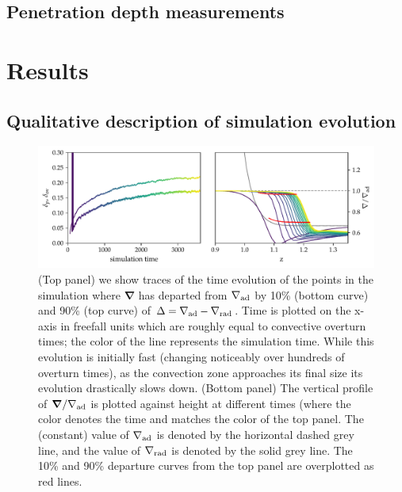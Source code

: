 \documentclass{aastex631}
\newcommand{\gradrad}{\ensuremath{\nabla_{\rm{rad}}}}
\newcommand{\gradad}{\ensuremath{\nabla_{\rm{ad}}}}
\renewcommand{\vec}[1]{\boldsymbol{#1}}
\newcommand{\grad}{\vec{\nabla}}
\begin{document}
\subsection{Penetration depth measurements}

\section{Results}
\label{sec:results}

\subsection{Qualitative description of simulation evolution}

\begin{figure}[t!]
\centering
\includegraphics[width=\textwidth]{time_evolution.pdf}
\caption{(Top panel) we show traces of the time evolution of the points in the simulation where $\grad$ has departed from $\gradad$ by 10\% (bottom curve) and 90\% (top curve) of $\Delta = \gradad - \gradrad$.
Time is plotted on the x-axis in freefall units which are roughly equal to convective overturn times; the color of the line represents the simulation time.
While this evolution is initially fast (changing noticeably over hundreds of overturn times), as the convection zone approaches its final size its evolution drastically slows down.
(Bottom panel) The vertical profile of $\grad/\gradad$ is plotted against height at different times (where the color denotes the time and matches the color of the top panel.
The (constant) value of $\gradad$ is denoted by the horizontal dashed grey line, and the value of $\gradrad$ is denoted by the solid grey line.
The 10\% and 90\% departure curves from the top panel are overplotted as red lines.
\label{fig:time_evolution}
}
\end{figure}
\end{document}
